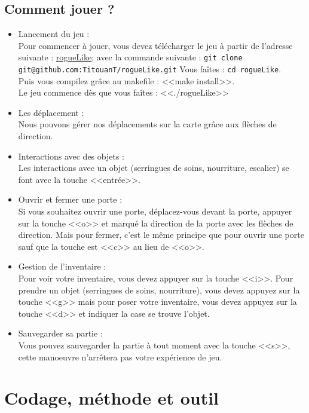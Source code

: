 \documentclass[12pt]{report}
\begin{document}
	\section{Comment jouer ?}
		\begin{itemize}
			\item{Lancement du jeu : \\}
				Pour commencer à jouer, vous devez télécharger le jeu à partir de l'adresse suivante : \href{https://github.com/TitouanT/rogueLike/} {rogueLike}; avec la commande suivante : \texttt{git clone git@github.com:TitouanT/rogueLike.git}
				Vous faîtes : \texttt{cd rogueLike}. \\
				Puis vous compilez grâce au makefile : <<make install>>. \\
				Le jeu commence dès que vous faîtes : <<./rogueLike>>		
			\item{Les déplacement : \\}
				Nous pouvons gérer nos déplacements sur la carte grâce aux flèches de direction. 
			\item{Interactions avec des objets : \\}	
				Les interactions avec un objet (serringues de soins, nourriture, escalier) se font avec la touche <<entrée>>.
			\item{Ouvrir et fermer une porte :\\}	
				Si vous souhaitez ouvrir une porte, déplacez-vous devant la porte, appuyer sur la touche <<o>> et marqué la direction de la porte avec les flèches de direction.
				Mais pour fermer, c'est le même principe que pour ouvrir une porte sauf que la touche est <<c>> au lieu de <<o>>.
			\item{Gestion de l'inventaire : \\}
				Pour voir votre inventaire, vous devez appuyer sur la touche <<i>>. Pour prendre un objet (serringues de soins, nourriture), vous devez appuyez sur la touche <<g>> mais pour poser votre inventaire, vous devez appuyez sur la touche <<d>> et indiquer la case se trouve l'objet.
			\item{Sauvegarder sa partie :\\}
				Vous pouvez sauvegarder la partie à tout moment avec la touche <<s>>, cette manoeuvre n'arrêtera pas votre expérience de jeu.		
		\end{itemize}
		
\chapter{Codage, méthode et outil}
\end{document}
